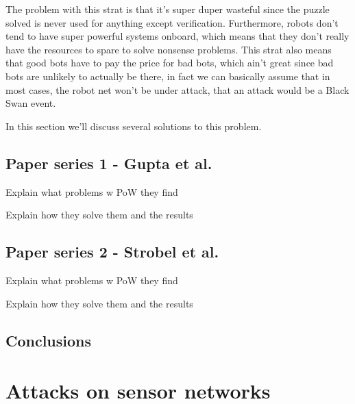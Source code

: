 The problem with this strat is that it's super duper wasteful since the puzzle solved is never used for anything except verification. Furthermore, robots don't tend to have super powerful systems onboard, which means that they don't really have the resources to spare to solve nonsense problems. This strat also means that good bots have to pay the price for bad bots, which ain't great since bad bots are unlikely to actually be there, in fact we can basically assume that in most cases, the robot net won't be under attack, that an attack would be a Black Swan event.

In this section we'll discuss several solutions to this problem.



\subsection{Paper series 1 - Gupta et al.}
Explain what problems w PoW they find

Explain how they solve them and the results

\subsection{Paper series 2 - Strobel et al.}

Explain what problems w PoW they find

Explain how they solve them and the results

\subsection{Conclusions}

\section{Attacks on sensor networks}

